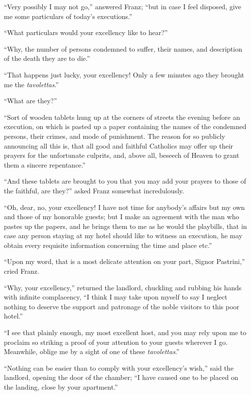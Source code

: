“Very possibly I may not go,” answered Franz; “but in case I feel
disposed, give me some particulars of today’s executions.”

“What particulars would your excellency like to hear?”

“Why, the number of persons condemned to suffer, their names, and
description of the death they are to die.”

“That happens just lucky, your excellency! Only a few minutes ago they
brought me the \textit{tavolettas}.”

“What are they?”

“Sort of wooden tablets hung up at the corners of streets the evening
before an execution, on which is pasted up a paper containing the names
of the condemned persons, their crimes, and mode of punishment. The
reason for so publicly announcing all this is, that all good and
faithful Catholics may offer up their prayers for the unfortunate
culprits, and, above all, beseech of Heaven to grant them a sincere
repentance.”

“And these tablets are brought to you that you may add your prayers to
those of the faithful, are they?” asked Franz somewhat incredulously.

“Oh, dear, no, your excellency! I have not time for anybody’s affairs
but my own and those of my honorable guests; but I make an agreement
with the man who pastes up the papers, and he brings them to me as he
would the playbills, that in case any person staying at my hotel should
like to witness an execution, he may obtain every requisite information
concerning the time and place etc.”

“Upon my word, that is a most delicate attention on your part, Signor
Pastrini,” cried Franz.

“Why, your excellency,” returned the landlord, chuckling and rubbing
his hands with infinite complacency, “I think I may take upon myself to
say I neglect nothing to deserve the support and patronage of the noble
visitors to this poor hotel.”

“I see that plainly enough, my most excellent host, and you may rely
upon me to proclaim so striking a proof of your attention to your
guests wherever I go. Meanwhile, oblige me by a sight of one of these
\textit{tavolettas}.”

“Nothing can be easier than to comply with your excellency’s wish,”
said the landlord, opening the door of the chamber; “I have caused one
to be placed on the landing, close by your apartment.”

